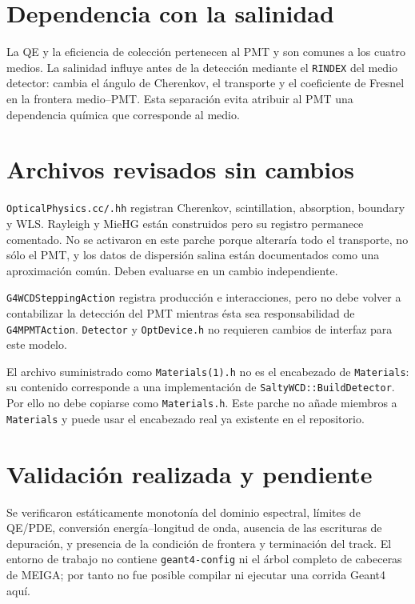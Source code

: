 \documentclass[11pt,a4paper]{article}
\begin{document}
\section{Dependencia con la salinidad}
La QE y la eficiencia de colección pertenecen al PMT y son comunes a los cuatro
medios. La salinidad influye antes de la detección mediante el \texttt{RINDEX}
del medio detector: cambia el ángulo de Cherenkov, el transporte y el coeficiente
de Fresnel en la frontera medio--PMT. Esta separación evita atribuir al PMT una
dependencia química que corresponde al medio.

\section{Archivos revisados sin cambios}
\texttt{OpticalPhysics.cc/.hh} registran Cherenkov, scintillation, absorption,
boundary y WLS. Rayleigh y MieHG están construidos pero su registro permanece
comentado. No se activaron en este parche porque alteraría todo el transporte,
no sólo el PMT, y los datos de dispersión salina están documentados como una
aproximación común. Deben evaluarse en un cambio independiente.

\texttt{G4WCDSteppingAction} registra producción e interacciones, pero no debe
volver a contabilizar la detección del PMT mientras ésta sea responsabilidad de
\texttt{G4MPMTAction}. \texttt{Detector} y \texttt{OptDevice.h} no requieren
cambios de interfaz para este modelo.

El archivo suministrado como \texttt{Materials(1).h} no es el encabezado de
\texttt{Materials}: su contenido corresponde a una implementación de
\texttt{SaltyWCD::BuildDetector}. Por ello no debe copiarse como
\texttt{Materials.h}. Este parche no añade miembros a \texttt{Materials} y puede
usar el encabezado real ya existente en el repositorio.

\section{Validación realizada y pendiente}
Se verificaron estáticamente monotonía del dominio espectral, límites de QE/PDE,
conversión energía--longitud de onda, ausencia de las escrituras de depuración,
y presencia de la condición de frontera y terminación del track. El entorno de
trabajo no contiene \texttt{geant4-config} ni el árbol completo de cabeceras de
MEIGA; por tanto no fue posible compilar ni ejecutar una corrida Geant4 aquí.
\end{document}
